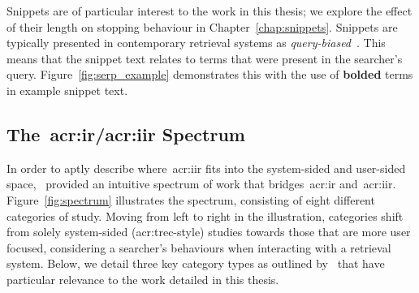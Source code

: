 Snippets are of particular interest to the work in this thesis; we explore the effect of their length on stopping behaviour in Chapter~\ref{chap:snippets}. Snippets are typically presented in contemporary retrieval systems as \emph{query-biased}~\citep{tombros1998query_biased}. This means that the snippet text relates to terms that were present in the searcher's query. Figure~\ref{fig:serp_example} demonstrates this with the use of \textbf{bolded} terms in example snippet text.

\subsection{The~\gls{acr:ir}/\gls{acr:iir} Spectrum}\label{sec:ir_background:user:spectrum}
In order to aptly describe where~\gls{acr:iir} fits into the system-sided and user-sided space,~\cite{kelly2009iir} provided an intuitive spectrum of work that bridges~\gls{acr:ir} and~\gls{acr:iir}. Figure~\ref{fig:spectrum} illustrates the spectrum, consisting of eight different categories of study. Moving from left to right in the illustration, categories shift from solely system-sided (\gls{acr:trec}-style) studies towards those that are more user focused, considering a searcher's behaviours when interacting with a retrieval system. Below, we detail three key category types as outlined by~\cite{kelly2009iir} that have particular relevance to the work detailed in this thesis.

